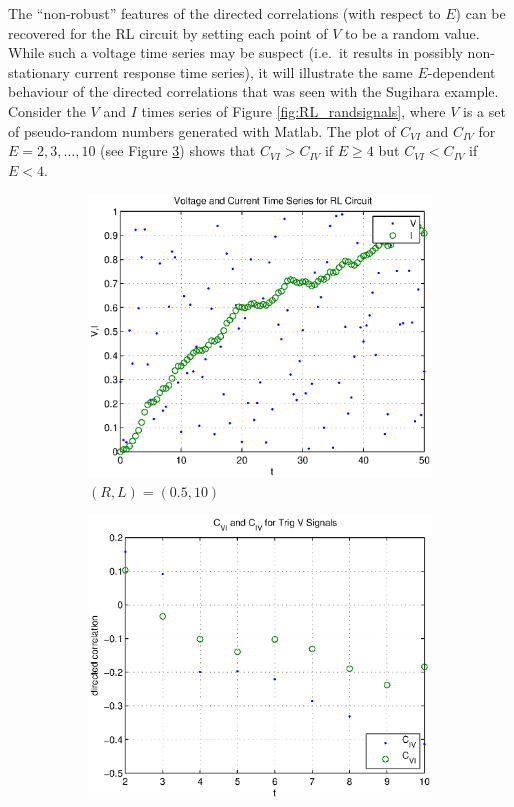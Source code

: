 \documentclass[a4paper,11pt]{article}
\begin{document}
The ``non-robust'' features of the directed correlations (with respect to $E$) can be recovered for the RL circuit by setting each point of $V$ to be a random value.  While such a voltage time series may be suspect (i.e.\ it results in possibly non-stationary current response time series), it will illustrate the same $E$-dependent behaviour of the directed correlations that was seen with the Sugihara example.  Consider the $V$ and $I$ times series of Figure \ref{fig:RL_randsignals}, where $V$ is a set of pseudo-random numbers generated with Matlab.  The plot of $C_{VI}$ and $C_{IV}$ for $E=2,3,\ldots,10$ (see Figure \ref{fig:RL_randsignalsCCM}) shows that $C_{VI}>C_{IV}$ if $E\ge 4$ but $C_{VI}<C_{IV}$ if $E<4$.
\begin{figure}[h!t]
\centering
\begin{subfigure}[b]{0.4\textwidth}
\label{fig:RL_randsignals.eps}
\includegraphics[scale=0.55]{graphics/RL_randsignals.eps}
\caption{$(R,L) = (0.5,10)$}
\end{subfigure}
\begin{subfigure}[b]{0.4\textwidth}
\label{fig:RL_randsignalsCCM}
\includegraphics[scale=0.55]{graphics/RL_randsignalsCCM.eps}

\end{subfigure}
\end{figure}
\end{document}
